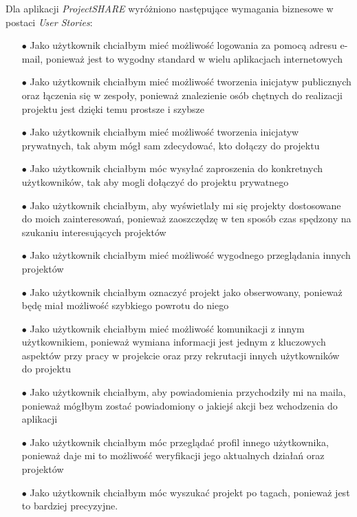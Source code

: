 Dla aplikacji \mbox{\textit{ProjectSHARE}} wyróżniono następujące wymagania biznesowe w postaci \textit{User Stories}:
\begin{itemize}
	\item[$\bullet$] Jako użytkownik chciałbym mieć możliwość logowania za pomocą adresu e-mail, ponieważ jest to wygodny standard w wielu aplikacjach internetowych
	\item[$\bullet$] Jako użytkownik chciałbym mieć możliwość tworzenia inicjatyw publicznych oraz łączenia się w zespoły, ponieważ znalezienie osób chętnych do realizacji projektu jest dzięki temu prostsze i szybsze
	\item[$\bullet$] Jako użytkownik chciałbym mieć możliwość tworzenia inicjatyw prywatnych, tak abym mógł sam zdecydować, kto dołączy do projektu 
	\item[$\bullet$] Jako użytkownik chciałbym móc wysyłać zaproszenia do konkretnych użytkowników, tak aby mogli dołączyć do projektu prywatnego
	\item[$\bullet$] Jako użytkownik chciałbym, aby wyświetlały mi się projekty dostosowane do moich zainteresowań, ponieważ zaoszczędzę w ten sposób czas spędzony na szukaniu interesujących projektów
	\item[$\bullet$] Jako użytkownik chciałbym mieć możliwość wygodnego przeglądania innych projektów
	\item[$\bullet$] Jako użytkownik chciałbym oznaczyć projekt jako obserwowany, ponieważ będę miał możliwość szybkiego powrotu do niego
	\item[$\bullet$] Jako użytkownik chciałbym mieć możliwość komunikacji z innym użytkownikiem, ponieważ wymiana informacji jest jednym z kluczowych aspektów przy pracy w projekcie oraz przy rekrutacji innych użytkowników do projektu
	\item[$\bullet$] Jako użytkownik chciałbym, aby powiadomienia przychodziły mi na maila, ponieważ mógłbym zostać powiadomiony o jakiejś akcji bez wchodzenia do aplikacji
	\item[$\bullet$] Jako użytkownik chciałbym móc przeglądać profil innego użytkownika, ponieważ daje mi to możliwość weryfikacji jego aktualnych działań oraz projektów
	\item[$\bullet$] Jako użytkownik chciałbym móc wyszukać projekt po tagach, ponieważ jest to bardziej precyzyjne.
\end{itemize}

\bigskip

